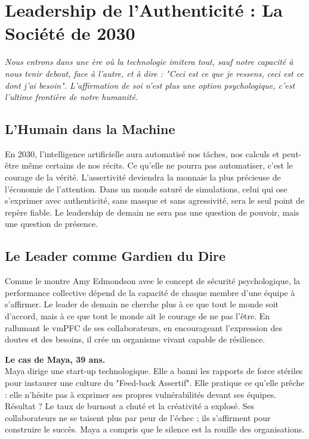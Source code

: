 \chapter{Leadership de l'Authenticité : La Société de 2030}

\textit{Nous entrons dans une ère où la technologie imitera tout, sauf notre capacité à nous tenir debout, face à l'autre, et à dire : "Ceci est ce que je ressens, ceci est ce dont j'ai besoin". L'affirmation de soi n'est plus une option psychologique, c'est l'ultime frontière de notre humanité.}

\section{L'Humain dans la Machine}
En 2030, l'intelligence artificielle aura automatisé nos tâches, nos calculs et peut-être même certains de nos récits. Ce qu'elle ne pourra pas automatiser, c'est le courage de la vérité. L'assertivité deviendra la monnaie la plus précieuse de l'économie de l'attention. Dans un monde saturé de simulations, celui qui ose s'exprimer avec authenticité, sans masque et sans agressivité, sera le seul point de repère fiable. Le leadership de demain ne sera pas une question de pouvoir, mais une question de présence.

\section{Le Leader comme Gardien du Dire}
Comme le montre Amy Edmondson avec le concept de sécurité psychologique, la performance collective dépend de la capacité de chaque membre d'une équipe à s'affirmer. Le leader de demain ne cherche plus à ce que tout le monde soit d'accord, mais à ce que tout le monde ait le courage de ne pas l'être. En rallumant le vmPFC de ses collaborateurs, en encourageant l'expression des doutes et des besoins, il crée un organisme vivant capable de résilience.

\begin{NoteClinique}
\textbf{Le cas de Maya, 39 ans.} \\
Maya dirige une start-up technologique. Elle a banni les rapports de force stériles pour instaurer une culture du "Feed-back Assertif". Elle pratique ce qu'elle prêche : elle n'hésite pas à exprimer ses propres vulnérabilités devant ses équipes. Résultat ? Le taux de burnout a chuté et la créativité a explosé. Ses collaborateurs ne se taisent plus par peur de l'échec ; ils s'affirment pour construire le succès. Maya a compris que le silence est la rouille des organisations.
\end{NoteClinique}

